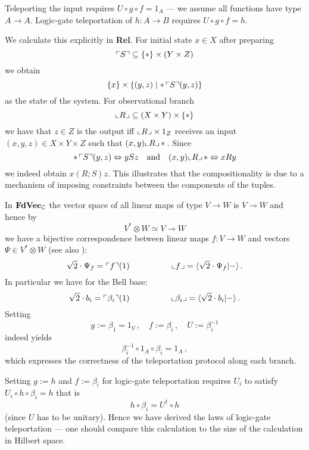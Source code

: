 \documentclass[10pt]{article}
\begin{document}
\vspace{1.3mm} 
 
\vspace{-4.6mm}\noindent
Teleporting the input requires
$U\circ g\circ f=1_A$ --- we assume all functions have type $A\to A$.
Logic-gate teleportation of $h:A\to B$ requires $U\circ g\circ f=h$.

We 
calculate this explicitly in {\bf Rel}. For initial state
$x\in X$ after preparing 
\[
{\ulcorner S\urcorner\subseteq\{*\}\times(Y\times Z)}
\]
we obtain 
\[
\{x\}\times \{(y,z)\mid *\,\ulcorner S\urcorner(y,z)\}
\]
as the state
of the system. For observational branch
\[
\llcorner R\lrcorner\subseteq (X\times Y)\times \{*\}
\] 
we have that $z\in Z$ is the output iff $\llcorner R\lrcorner\times 1_Z$
receives  an input $(x,y,z)\in X\times Y\times Z$
such that $(x,y)\llcorner R\lrcorner\,*\,$.
Since 
\[
*\,\ulcorner S\urcorner(y,z)\Leftrightarrow ySz\quad {\rm and}\quad (x,y)\llcorner
R\lrcorner\,*\Leftrightarrow xRy
\]
we indeed obtain $x(R;S)z$.
This illustrates that the compositionality
is due to a mechanism of imposing constraints between the components
of the tuples.

In ${\bf FdVec}_\mathbb{C}$   
the vector space of all linear maps of type $V\to W$ is $V\multimap W$ and
hence by 
\[
{V^*\otimes W\simeq V\multimap W}
\]
we have a bijective
correspondence between linear maps
${f:V\to W}$ and vectors $\Psi\in V^*\otimes W$ (see also
\cite{Coe1,Coe2}):
\[
\sqrt{2}\cdot \Psi_f=\ulcorner f\urcorner(1)\quad\quad\quad\quad\quad\llcorner
f\lrcorner=\langle\sqrt{2}\cdot\Psi_f|-\rangle\,.
\]
In particular we have for the Bell base:
\[
\sqrt{2}\cdot b_i=\ulcorner \beta_i\urcorner(1)\quad\quad\quad\quad\quad\llcorner
\beta_i\lrcorner=\langle \sqrt{2}\cdot b_i|-\rangle\,.
\]  
Setting 
\[
g:=\beta_1=1_V\,,\quad f:=\beta_i\,,\quad U:=\beta_i^{-1}
\]
indeed yields 
\[
\beta_i^{-1}\circ 1_A\circ\beta_i=1_A\,,
\] 
which expresses the correctness
of the teleportation protocol along each branch.

Setting $g:=h$ and $f:=\beta_i$ for logic-gate teleportation requires
$U_i$ to satisfy
$U_i\circ h\circ \beta_i=h$ that is 
\[
{h\circ
\beta_i=U^\dagger\circ h}
\]
(since $U$ has to be unitary).
Hence we have derived the laws of logic-gate teleportation --- one should
compare this calculation to the size of the calculation in
Hilbert space.
\end{document}
